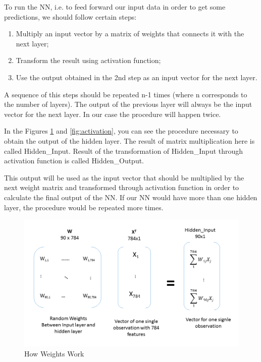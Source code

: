 To run the NN, i.e. to feed forward our input data in order to get some predictions, we should follow certain steps:

\begin{enumerate}
    \item Multiply an input vector by a matrix of weights that connects it with the next layer;
    \item Transform the result using activation function;
    \item Use the output obtained in the 2nd step as an input vector for the next layer.
\end{enumerate}

A sequence of this steps should be repeated n-1 times (where n corresponds to the number of layers). The output of the previous layer will always be the input vector for the next layer. In our case the procedure will happen twice.

In the Figures \ref{fig:multiplication} and \ref{fig:activation}, you can see the procedure necessary to obtain the output of the hidden layer. The result of matrix multiplication here is called Hidden\_Input. Result of the transformation of Hidden\_Input through activation function is called Hidden\_Output.

This output will be used as the input vector that should be multiplied by the next weight matrix and transformed through activation function in order to calculate the final output of the NN. If our NN would have more than one hidden layer, the procedure would be repeated more times.

\begin{figure}[H]
    \includegraphics[width=\linewidth]{pics/multiplication.png}
    \caption{\label{fig:multiplication} How Weights Work}
\end{figure}

